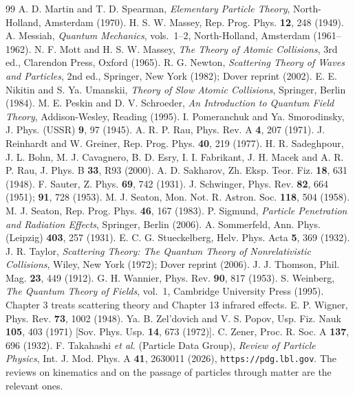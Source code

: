 \documentclass[11pt,a4paper]{book}
\numberwithin{equation}{chapter}
\begin{document}
\begin{thebibliography}{99}
 A. D. Martin and T. D. Spearman, \emph{Elementary Particle Theory}, North-Holland, Amsterdam (1970).
 H. S. W. Massey, Rep. Prog. Phys. \textbf{12}, 248 (1949).
 A. Messiah, \emph{Quantum Mechanics}, vols.~1--2, North-Holland, Amsterdam (1961--1962).
 N. F. Mott and H. S. W. Massey, \emph{The Theory of Atomic Collisions}, 3rd ed., Clarendon Press, Oxford (1965).
 R. G. Newton, \emph{Scattering Theory of Waves and Particles}, 2nd ed., Springer, New York (1982); Dover reprint (2002).
 E. E. Nikitin and S. Ya. Umanskii, \emph{Theory of Slow Atomic Collisions}, Springer, Berlin (1984).
 M. E. Peskin and D. V. Schroeder, \emph{An Introduction to Quantum Field Theory}, Addison-Wesley, Reading (1995).
 I. Pomeranchuk and Ya. Smorodinsky, J. Phys. (USSR) \textbf{9}, 97 (1945).
 A. R. P. Rau, Phys. Rev. A \textbf{4}, 207 (1971).
 J. Reinhardt and W. Greiner, Rep. Prog. Phys. \textbf{40}, 219 (1977).
 H. R. Sadeghpour, J. L. Bohn, M. J. Cavagnero, B. D. Esry, I. I. Fabrikant, J. H. Macek and A. R. P. Rau, J. Phys. B \textbf{33}, R93 (2000).
 A. D. Sakharov, Zh. Eksp. Teor. Fiz. \textbf{18}, 631 (1948).
 F. Sauter, Z. Phys. \textbf{69}, 742 (1931).
 J. Schwinger, Phys. Rev. \textbf{82}, 664 (1951); \textbf{91}, 728 (1953).
 M. J. Seaton, Mon. Not. R. Astron. Soc. \textbf{118}, 504 (1958).
 M. J. Seaton, Rep. Prog. Phys. \textbf{46}, 167 (1983).
 P. Sigmund, \emph{Particle Penetration and Radiation Effects}, Springer, Berlin (2006).
 A. Sommerfeld, Ann. Phys. (Leipzig) \textbf{403}, 257 (1931).
 E. C. G. Stueckelberg, Helv. Phys. Acta \textbf{5}, 369 (1932).
 J. R. Taylor, \emph{Scattering Theory: The Quantum Theory of Nonrelativistic Collisions}, Wiley, New York (1972); Dover reprint (2006).
 J. J. Thomson, Phil. Mag. \textbf{23}, 449 (1912).
 G. H. Wannier, Phys. Rev. \textbf{90}, 817 (1953).
 S. Weinberg, \emph{The Quantum Theory of Fields}, vol.~1, Cambridge University Press (1995). Chapter 3 treats scattering theory and Chapter 13 infrared effects.
 E. P. Wigner, Phys. Rev. \textbf{73}, 1002 (1948).
 Ya. B. Zel'dovich and V. S. Popov, Usp. Fiz. Nauk \textbf{105}, 403 (1971) [Sov. Phys. Usp. \textbf{14}, 673 (1972)].
 C. Zener, Proc. R. Soc. A \textbf{137}, 696 (1932).
 F. Takahashi \emph{et al.} (Particle Data Group), \emph{Review of Particle Physics}, Int. J. Mod. Phys. A \textbf{41}, 2630011 (2026), \texttt{https://pdg.lbl.gov}. The reviews on kinematics and on the passage of particles through matter are the relevant ones.
\end{thebibliography}
\end{document}
